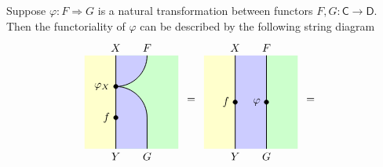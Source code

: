 Suppose $\varphi:F\Rightarrow G$ is a natural transformation between functors $F,G:\mathsf{C}\to \mathsf{D}$. Then the functoriality of $\varphi$ can be described by the following string diagram
\[
\begin{tikzpicture}[x=1cm,y=1cm, baseline=(current bounding box.center)]
    \definecolor{leftcolor}{RGB}{255,255,204} %
    \definecolor{rightcolor}{RGB}{204,204,255} %

    \fill[leftcolor] (0,0) rectangle (1,3);
    \fill[green!20] (1,0) rectangle (3,3);
    \begin{scope} 
        \clip (1,0) rectangle (3, 3); 
        \draw[fill=blue!20, rounded corners=1cm, line width=0.7pt] (0,2) rectangle (2, 5);
        \draw[fill=blue!20, rounded corners=1cm, line width=0.7pt] (0,2) rectangle (2, -1);
    \end{scope} 
    \draw[line width=0.7pt] (1,0) -- (1,3);
    \filldraw [black] (1,1) circle (2pt) node[left=2pt] {$f$};
    \filldraw [black] (1,2) circle (2pt) node[left=2pt] {$\varphi_X$};
    \draw (1,0) node[below] {$Y$};
    \draw (1,3) node[above] {$X$};
    \draw (2,0) node[below] {$G$};
    \draw (2,3) node[above] {$F$};
\end{tikzpicture}
\hspace{5pt}=\hspace{5pt}
\begin{tikzpicture}[x=1cm,y=1cm, baseline=(current bounding box.center)]
    \definecolor{leftcolor}{RGB}{255,255,204} %
    \definecolor{rightcolor}{RGB}{204,204,255} %

    \fill[leftcolor] (0,0) rectangle (1,3);
    \fill[blue!20] (1,0) rectangle (2,3);
    \fill[green!20] (2,0) rectangle (3,3);
 
    \draw[line width=0.7pt] (1,0) -- (1,3);
    \draw[line width=0.7pt] (2,0) -- (2,3);
    \filldraw [black] (1,1.5) circle (2pt) node[left=2pt] {$f$};
    \filldraw [black] (2,1.5) circle (2pt) node[left=2pt] {$\varphi$};
    \draw (1,0) node[below] {$Y$};
    \draw (1,3) node[above] {$X$};
    \draw (2,0) node[below] {$G$};
    \draw (2,3) node[above] {$F$};
\end{tikzpicture}
\hspace{5pt}=\hspace{5pt}
\begin{tikzpicture}[x=1cm,y=1cm, baseline=(current bounding box.center)]
    \definecolor{leftcolor}{RGB}{255,255,204} %
    \definecolor{rightcolor}{RGB}{204,204,255} %


\end{tikzpicture}\]
